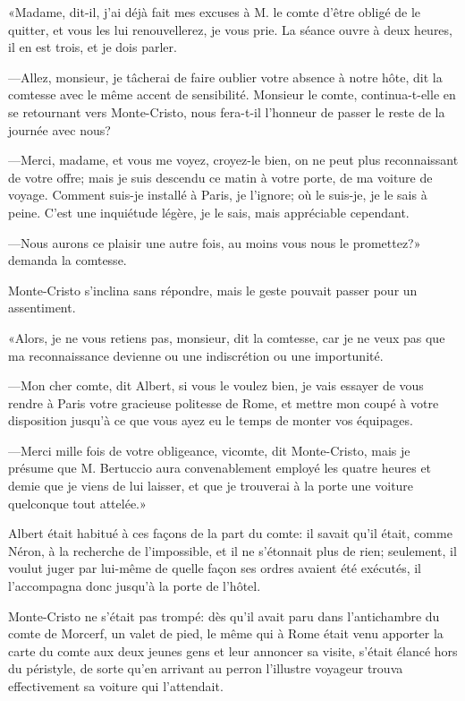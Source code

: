 «Madame, dit-il, j'ai déjà fait mes excuses à M. le comte d'être obligé de le quitter, et vous les lui renouvellerez, je vous prie. La séance ouvre à deux heures, il en est trois, et je dois parler. 

—Allez, monsieur, je tâcherai de faire oublier votre absence à notre hôte, dit la comtesse avec le même accent de sensibilité. Monsieur le comte, continua-t-elle en se retournant vers Monte-Cristo, nous fera-t-il l'honneur de passer le reste de la journée avec nous? 

—Merci, madame, et vous me voyez, croyez-le bien, on ne peut plus reconnaissant de votre offre; mais je suis descendu ce matin à votre porte, de ma voiture de voyage. Comment suis-je installé à Paris, je l'ignore; où le suis-je, je le sais à peine. C'est une inquiétude légère, je le sais, mais appréciable cependant. 

—Nous aurons ce plaisir une autre fois, au moins vous nous le promettez?» demanda la comtesse. 

Monte-Cristo s'inclina sans répondre, mais le geste pouvait passer pour un assentiment. 

«Alors, je ne vous retiens pas, monsieur, dit la comtesse, car je ne veux pas que ma reconnaissance devienne ou une indiscrétion ou une importunité. 

—Mon cher comte, dit Albert, si vous le voulez bien, je vais essayer de vous rendre à Paris votre gracieuse politesse de Rome, et mettre mon coupé à votre disposition jusqu'à ce que vous ayez eu le temps de monter vos équipages. 

—Merci mille fois de votre obligeance, vicomte, dit Monte-Cristo, mais je présume que M. Bertuccio aura convenablement employé les quatre heures et demie que je viens de lui laisser, et que je trouverai à la porte une voiture quelconque tout attelée.» 

Albert était habitué à ces façons de la part du comte: il savait qu'il était, comme Néron, à la recherche de l'impossible, et il ne s'étonnait plus de rien; seulement, il voulut juger par lui-même de quelle façon ses ordres avaient été exécutés, il l'accompagna donc jusqu'à la porte de l'hôtel. 

Monte-Cristo ne s'était pas trompé: dès qu'il avait paru dans l'antichambre du comte de Morcerf, un valet de pied, le même qui à Rome était venu apporter la carte du comte aux deux jeunes gens et leur annoncer sa visite, s'était élancé hors du péristyle, de sorte qu'en arrivant au perron l'illustre voyageur trouva effectivement sa voiture qui l'attendait. 

